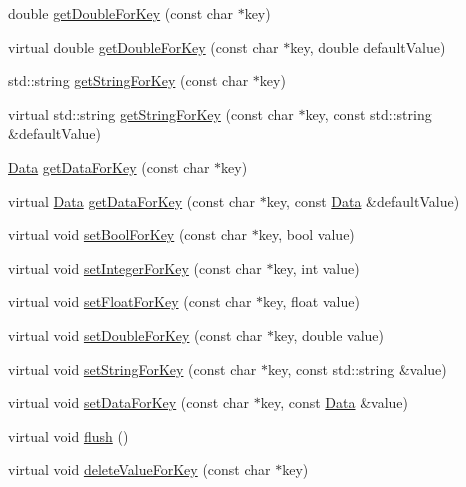 \begin{DoxyCompactItemize}
\item 
double \hyperlink{classUserDefault_a5cde9f96889493950057fb4b6ec34464}{get\+Double\+For\+Key} (const char $\ast$key)
\item 
virtual double \hyperlink{classUserDefault_ae685a6633747ecfc3c9dedd5306b219e}{get\+Double\+For\+Key} (const char $\ast$key, double default\+Value)
\item 
std\+::string \hyperlink{classUserDefault_afd5ed352bbd91dbe2c0c377ad31e8a59}{get\+String\+For\+Key} (const char $\ast$key)
\item 
virtual std\+::string \hyperlink{classUserDefault_ae67d0bfe9e3a515f0f73f5dec4fc320e}{get\+String\+For\+Key} (const char $\ast$key, const std\+::string \&default\+Value)
\item 
\hyperlink{classData}{Data} \hyperlink{classUserDefault_aa01598193b5ee7c6db0b53e02297d44d}{get\+Data\+For\+Key} (const char $\ast$key)
\item 
virtual \hyperlink{classData}{Data} \hyperlink{classUserDefault_a835cf46f90b74654728de4c1ace8ff9a}{get\+Data\+For\+Key} (const char $\ast$key, const \hyperlink{classData}{Data} \&default\+Value)
\item 
virtual void \hyperlink{classUserDefault_a519cfd627086d25fd6aa8c4518f4f4d9}{set\+Bool\+For\+Key} (const char $\ast$key, bool value)
\item 
virtual void \hyperlink{classUserDefault_a05d2e093416141bcbf1ab2fcf8aedc5f}{set\+Integer\+For\+Key} (const char $\ast$key, int value)
\item 
virtual void \hyperlink{classUserDefault_ad8f05807ed0d3715f253cb25faa1a297}{set\+Float\+For\+Key} (const char $\ast$key, float value)
\item 
virtual void \hyperlink{classUserDefault_a653f3370b0d14414d5cd51e9c7b3a68a}{set\+Double\+For\+Key} (const char $\ast$key, double value)
\item 
virtual void \hyperlink{classUserDefault_a2d14d97149a1eb66f03b143d01f8c9b5}{set\+String\+For\+Key} (const char $\ast$key, const std\+::string \&value)
\item 
virtual void \hyperlink{classUserDefault_a3635db62c1a64343eea3d9429a6ee061}{set\+Data\+For\+Key} (const char $\ast$key, const \hyperlink{classData}{Data} \&value)
\item 
virtual void \hyperlink{classUserDefault_a5ac32c77783bf00480575f8bbe619a7e}{flush} ()
\item 
virtual void \hyperlink{classUserDefault_a15473f415e18246ce2ee0d9f4e9cafe4}{delete\+Value\+For\+Key} (const char $\ast$key)
\end{DoxyCompactItemize}
